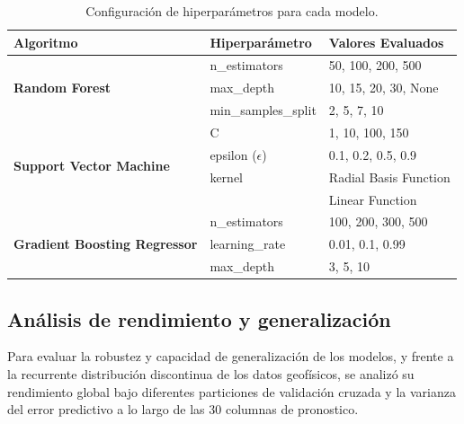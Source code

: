 					\begin{table}[h!]
						\centering
						\caption{Configuración de hiperparámetros para cada modelo.}
						\label{tab:hiperparametros-modelos} 
						\small 
						\begin{tabular}{lll}
							\toprule
							\textbf{Algoritmo}                                     & \textbf{Hiperparámetro} & \textbf{Valores Evaluados} \\
							\midrule
							\multirow{3}{*}{\textbf{Random Forest}}                & n\_estimators           & 50, 100, 200, 500 \\
							                                                       & max\_depth              & 10, 15, 20, 30, None \\
							                                                       & min\_samples\_split     & 2, 5, 7, 10 \\
							\midrule
							\multirow{4}{*}{\textbf{Support Vector Machine}}       & C                       & 1, 10, 100, 150 \\
							                                                       & epsilon ($\epsilon$)    & 0.1, 0.2, 0.5, 0.9 \\
							                                                       & kernel                  & Radial Basis Function \\
							                                                       &                         & Linear Function \\
							\midrule
							\multirow{3}{*}{\textbf{Gradient Boosting Regressor}}  & n\_estimators           & 100, 200, 300, 500 \\
							                                                       & learning\_rate          & 0.01, 0.1, 0.99 \\
							                                                       & max\_depth              & 3, 5, 10 \\
							\bottomrule
						\end{tabular}
					\end{table}
					
					
	\subsection{Análisis de rendimiento y generalización}
			
			Para evaluar la robustez y capacidad de generalización de los modelos, y frente a la recurrente distribución discontinua de los datos geofísicos, se analizó su rendimiento global bajo diferentes particiones de validación cruzada y la varianza del error predictivo a lo largo de las 30 columnas de pronostico.
			
